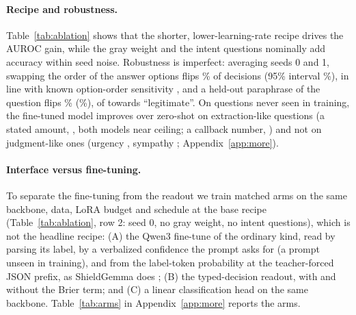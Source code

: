 \documentclass[11pt]{article}
\begin{document}
\paragraph{Recipe and robustness.} Table~\ref{tab:ablation} shows that the shorter, lower-learning-rate recipe drives the AUROC gain, while the gray weight and the intent questions nominally add accuracy within seed noise. Robustness is imperfect: averaging seeds 0 and 1, swapping the order of the answer options flips \swapflip\% of decisions (95\% interval \swapflipci\%), in line with known option-order sensitivity \citep{zheng2024mcq,pezeshkpour2024order}, and a held-out paraphrase of the question flips \paraflip\% (\paraflipci\%), \paratolegit{} of \paran{} towards ``legitimate''. On questions never seen in training, the fine-tuned model improves over zero-shot on extraction-like questions (a stated amount, \uqAmount{} \uqAmountci{}, both models near ceiling; a callback number, \uqPhone{} \uqPhoneci{}) and not on judgment-like ones (urgency \uqUrgency{} \uqUrgencyci{}, sympathy \uqSympathy{} \uqSympathyci{}; Appendix~\ref{app:more}).

\paragraph{Interface versus fine-tuning.}\label{sec:arms} To separate the fine-tuning from the readout we train matched arms on the same backbone, data, LoRA budget and schedule at the base recipe (Table~\ref{tab:ablation}, row 2: seed 0, no gray weight, no intent questions), which is not the headline recipe: (A) the Qwen3 fine-tune of the ordinary kind, read by parsing its label, by a verbalized confidence the prompt asks for (a prompt unseen in training), and from the label-token probability at the teacher-forced JSON prefix, as ShieldGemma does \citep{zeng2024shieldgemma}; (B) the typed-decision readout, with and without the Brier term; and (C) a linear classification head on the same backbone. Table~\ref{tab:arms} in Appendix~\ref{app:more} reports the arms.
\end{document}
